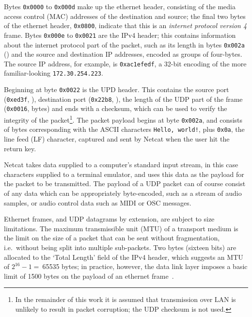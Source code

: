 Bytes \texttt{0x0000} to \texttt{0x000d} make up the ethernet header,
consisting of the media access control (MAC) addresses of the destination and
source; the final two bytes of the ethernet header, \texttt{0x0800}, indicate
that this is an \textit{internet protocol version 4} frame.
Bytes \texttt{0x000e} to \texttt{0x0021} are the IPv4 header; this contains
information about the internet protocol part of the packet, such as its length
in bytes \textemdash{} \texttt{0x002a} () \textemdash{} and
the source and destination IP addresses, encoded as groups of four-bytes.
The source IP address, for example, is \texttt{0xac1efedf}, a 32-bit encoding
of the more familiar-looking \texttt{172.30.254.223}.

Beginning at byte \texttt{0x0022} is the UPD header.
This contains the source port (\texttt{0xed3f}, ), destination
port (\texttt{0x22b8}, ), the length of the UDP part of the frame
(\texttt{0x0016},  bytes) and ends with a checksum, which
can be used to verify the integrity of the packet\footnote{
    In the remainder of this work it is assumed that transmission over LAN is
    unlikely to result in packet corruption; the UDP checksum is not used.
}.
The packet payload begins at byte \texttt{0x002a}, and consists of bytes
corresponding with the ASCII characters \texttt{Hello, world!}, plus
\texttt{0x0a}, the line feed (LF) character, captured and sent by Netcat when
the user hit the return key.

Netcat takes data supplied to a computer's standard input stream, in this
case characters supplied to a terminal emulator, and uses this data as the
payload for the packet to be transmitted.
The payload of a UDP packet can of course consist of any data which can be
appropriately byte-encoded, such as a stream of audio samples, or audio control
data such as MIDI or OSC messages.

Ethernet frames, and UDP datagrams by extension, are subject to size
limitations.
The maximum transmissible unit (MTU) of a transport medium is the limit on the
size of a packet that can be sent without fragmentation, i.e.\ without being
split into multiple sub-packets.
Two bytes (sixteen bits) are allocated to the `Total Length' field of the IPv4
header, which suggests an MTU of $2^{16}-1=~$\num{65535} bytes;
in practice, however, the data link layer imposes a basic limit of \num{1500}
bytes on the payload of an ethernet
frame~\citep{schiavoni_alternatives_2013,noauthor_ieee_2018}.
